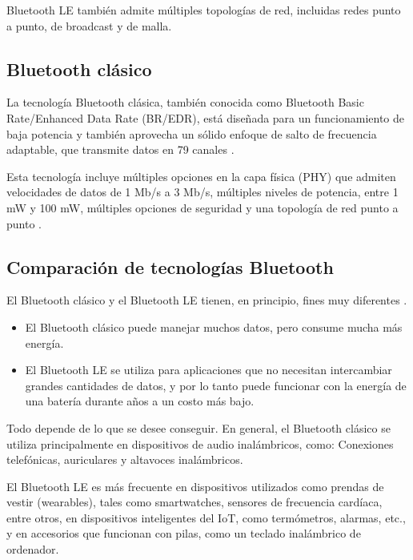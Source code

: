Bluetooth LE también admite múltiples topologías de red, incluidas redes punto a punto, de broadcast y de malla.


\subsection{Bluetooth clásico}

La tecnología Bluetooth clásica, también conocida como Bluetooth Basic Rate/Enhanced Data Rate (BR/EDR), está diseñada para un funcionamiento de baja potencia y también aprovecha un sólido enfoque de salto de frecuencia adaptable, que transmite datos en 79 canales \cite{bluetooth}.

Esta tecnología incluye múltiples opciones en la capa física (PHY) que admiten velocidades de datos de 1 Mb/s a 3 Mb/s, múltiples niveles de potencia, entre 1 mW y 100 mW, múltiples opciones de seguridad y una topología de red punto a punto \cite{bluetooth}.

\subsection{Comparación de tecnologías Bluetooth}

El Bluetooth clásico y el Bluetooth LE tienen, en principio, fines muy diferentes \cite{bluetoothV}.

\begin{itemize}

\item El Bluetooth clásico puede manejar muchos datos, pero consume mucha más energía.

\item El Bluetooth LE se utiliza para aplicaciones que no necesitan intercambiar grandes cantidades de datos, y por lo tanto puede funcionar con la energía de una batería durante años a un costo más bajo.

\end{itemize}

Todo depende de lo que se desee conseguir. En general, el Bluetooth clásico se utiliza principalmente en dispositivos de audio inalámbricos, como: Conexiones telefónicas, auriculares y altavoces inalámbricos.

El Bluetooth LE es más frecuente en dispositivos utilizados como prendas de vestir (wearables), tales como smartwatches, sensores de frecuencia cardíaca, entre otros, en dispositivos inteligentes del IoT, como termómetros, alarmas, etc., y en accesorios que funcionan con pilas, como un teclado inalámbrico de ordenador.

